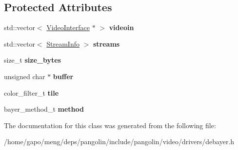 \subsection*{Protected Attributes}
\begin{DoxyCompactItemize}
\item 
std\+::vector$<$ \hyperlink{structpangolin_1_1_video_interface}{Video\+Interface} $\ast$ $>$ {\bfseries videoin}\hypertarget{classpangolin_1_1_debayer_video_aa342097d0d232e96c1fee8b234248ee8}{}\label{classpangolin_1_1_debayer_video_aa342097d0d232e96c1fee8b234248ee8}

\item 
std\+::vector$<$ \hyperlink{classpangolin_1_1_stream_info}{Stream\+Info} $>$ {\bfseries streams}\hypertarget{classpangolin_1_1_debayer_video_ad03742068d5994ca83b4a182adbd1b81}{}\label{classpangolin_1_1_debayer_video_ad03742068d5994ca83b4a182adbd1b81}

\item 
size\+\_\+t {\bfseries size\+\_\+bytes}\hypertarget{classpangolin_1_1_debayer_video_a2628558cc1b0dd7a1735521c17507ad3}{}\label{classpangolin_1_1_debayer_video_a2628558cc1b0dd7a1735521c17507ad3}

\item 
unsigned char $\ast$ {\bfseries buffer}\hypertarget{classpangolin_1_1_debayer_video_abf3153ef5cd48d0cdfe55e97a590b26a}{}\label{classpangolin_1_1_debayer_video_abf3153ef5cd48d0cdfe55e97a590b26a}

\item 
color\+\_\+filter\+\_\+t {\bfseries tile}\hypertarget{classpangolin_1_1_debayer_video_ae75a56606b60a7361c64a987bbac127c}{}\label{classpangolin_1_1_debayer_video_ae75a56606b60a7361c64a987bbac127c}

\item 
bayer\+\_\+method\+\_\+t {\bfseries method}\hypertarget{classpangolin_1_1_debayer_video_a597561e9e21b227b695f4102c16d016d}{}\label{classpangolin_1_1_debayer_video_a597561e9e21b227b695f4102c16d016d}

\end{DoxyCompactItemize}


The documentation for this class was generated from the following file\+:\begin{DoxyCompactItemize}
\item 
/home/gapo/meng/deps/pangolin/include/pangolin/video/drivers/debayer.\+h\end{DoxyCompactItemize}
